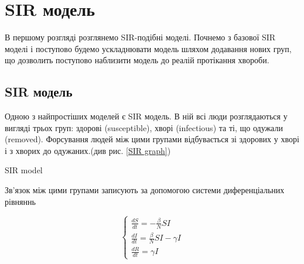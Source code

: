 \chapter{SIR модель}
В першому розгляді розглянемо SIR-подібні моделі. Почнемо з базової 
SIR моделі і поступово будемо ускладнювати модель шляхом додавання
нових груп, що дозволить поступово наблизити модель до реалій протікання
хвороби.

\section{SIR модель}
\par Одною з найпростіших моделей є SIR модель. 
В ній всі люди розглядаються у вигляді трьох груп: здорові (susceptible), хворі (infectious) та ті, що одужали (removed). 
Форсування людей між цими групами відбувається зі здорових у хворі 
і з хворих до одужаних.\cite{weiss_sir_2006}(див рис. \ref{SIR graph})  

\vspace{1cm}
\begin{risunok}[ht]
    \centering
    \vspace{0.5cm}
    \caption{SIR model}
    \label{SIR graph}
\end{risunok}

Зв’язок між цими групами записують за допомогою системи диференціальних рівняннь 

\begin{equation*}
    \begin{cases}
        \frac{dS}{dt} = - \frac{\beta}{N}SI          \\
        \frac{dI}{dt} = \frac{\beta}{N}SI - \gamma I \\
        \frac{dR}{dt} = \gamma I
    \end{cases}
\end{equation*}


